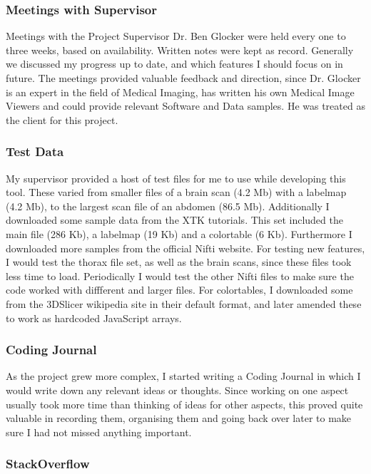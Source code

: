 \documentclass[a4paper,11pt,titlepage]{article}
\begin{document}
\subsubsection{Meetings with Supervisor}

Meetings with the Project Supervisor Dr. Ben Glocker were held every one to three weeks, based on availability. Written notes were kept as record. Generally we discussed my progress up to date, and which features I should focus on in future. The meetings provided valuable feedback and direction, since Dr. Glocker is an expert in the field of Medical Imaging, has written his own Medical Image Viewers and could provide relevant Software and Data samples. He was treated as the client for this project.


\subsubsection{Test Data}

My supervisor provided a host of test files for me to use while developing this tool. These varied from smaller files of a brain scan (4.2 Mb) with a labelmap (4.2 Mb), to the largest scan file of an abdomen (86.5 Mb). Additionally I downloaded some sample data from the XTK tutorials. This set included the main file (286 Kb), a labelmap (19 Kb) and a colortable (6 Kb). Furthermore I downloaded more samples from the official Nifti website. For testing new features, I would test the thorax file set, as well as the brain scans, since these files took less time to load. Periodically I would test the other Nifti files to make sure the code worked with diffferent and larger files.
For colortables, I downloaded some from the 3DSlicer wikipedia site in their default format, and later amended these to work as hardcoded JavaScript arrays.

\subsubsection{Coding Journal}

As the project grew more complex, I started writing a Coding Journal in which I would write down any relevant ideas or thoughts. Since working on one aspect usually took more time than thinking of ideas for other aspects, this proved quite valuable in recording them, organising them and going back over later to make sure I had not missed anything important.

\subsubsection{StackOverflow}
\end{document}
